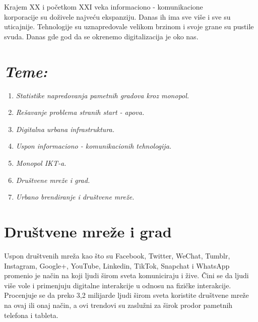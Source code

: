 \documentclass[a0,portrait]{a0poster}
\begin{document}
\begin{multicols}{2} 
\color{Black}
\color{Black}
\section*{}
\Large{
Krajem XX i početkom XXI veka informaciono - komunikacione \\ korporacije su doživele najveću ekspanziju. Danas ih ima sve više i sve su uticajnije. Tehnologije su uznapredovale velikom brzinom i svoje grane su pustile svuda. Danas gde god da se okrenemo digitalizacija je oko nas. 
}

\color{teal}

\vspace{100}
\section*{\huge{\textit{Teme:}}}

\begin{enumerate}
\item \textit{Statistike napredovanja pametnih gradova kroz monopol.}
\item \textit{Rešavanje problema stranih start - apova.}
\item \textit{Digitalna urbana infrastruktura.}
\item \textit{Uspon informaciono - komunikacionih tehnologija.}
\item \textit{Monopol IKT-a.}
\item \textit{Društvene mreže i grad.}
\item \textit{Urbano brendiranje i društvene mreže.}
\end{enumerate}

\color{black}

\vspace{100}
\section*{\Huge{Društvene mreže i grad}}

\Large{
Uspon društvenih mreža kao što su Facebook, Twitter, WeChat, Tumblr, Instagram, Google+, YouTube, Linkedin, TikTok, Snapchat i WhatsApp promenio je način na koji ljudi širom sveta komuniciraju i žive. Čini se da ljudi više vole i primenjuju digitalne interakcije u odnosu na fizičke interakcije. 
Procenjuje se da preko 3,2 milijarde ljudi širom sveta koristite društvene mreže na ovaj ili onaj način, a ovi trendovi su zaslužni za širok prodor pametnih telefona i tableta.
}


\end{multicols}
\end{document}
